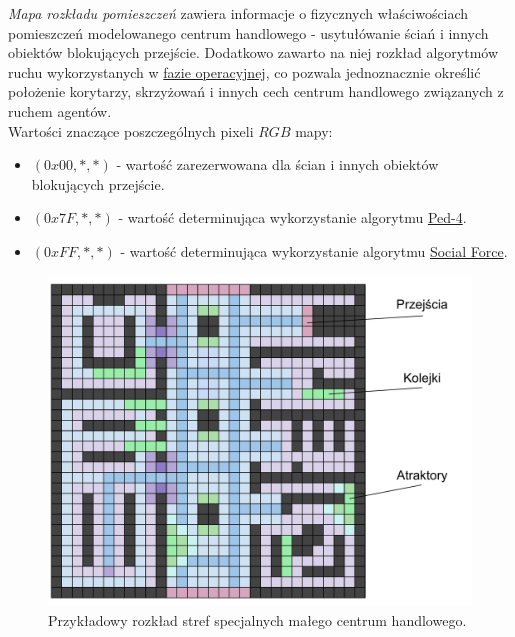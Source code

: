 \documentclass[a4paper, 12pt]{article}
\begin{document}
        \emph{Mapa rozkładu pomieszczeń} zawiera informacje o fizycznych właściwościach pomieszczeń modelowanego centrum handlowego - usytułówanie ściań i innych obiektów blokujących przejście. Dodatkowo zawarto na niej rozkład algorytmów ruchu wykorzystanych w \hyperref[sec:operational]{fazie operacyjnej}, co pozwala jednoznacznie określić położenie korytarzy, skrzyżowań i innych cech centrum handlowego związanych z ruchem agentów. \\

\noindent
Wartości znaczące poszczególnych pixeli $RGB$ mapy:

        \begin{itemize}
            \item $(0x00, *, *)$ - wartość zarezerwowana dla ścian i innych obiektów blokujących przejście.
            \item $(0x7F, *, *)$ - wartość determinująca wykorzystanie algorytmu \hyperref[sec:ped-4-impl]{Ped-4}.
            \item $(0xFF, *, *)$ - wartość determinująca wykorzystanie algorytmu \hyperref[sec:social-force-impl]{Social Force}.
        \end{itemize}

        \begin{figure}[H]
            \centering
            \includegraphics[scale=0.3]{./img/MallFeatures.pdf}
            \caption{Przykładowy rozkład stref specjalnych małego centrum handlowego.}
            \label{fig:mall-features}
        \end{figure}
\end{document}
